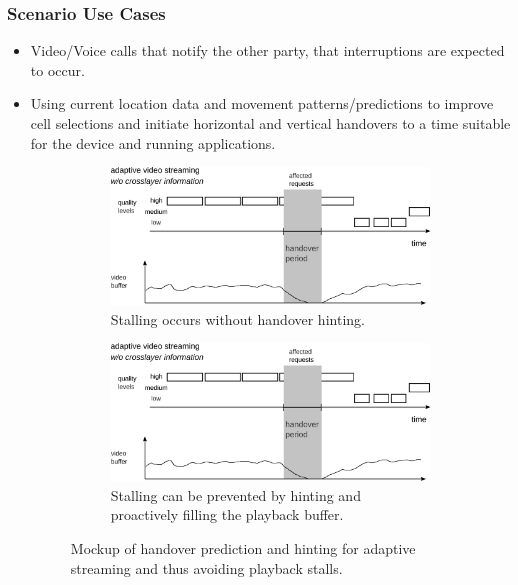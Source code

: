 		

\subsubsection{Scenario Use Cases}

\begin{itemize}
	\item Video/Voice calls that notify the other party, that interruptions are expected to occur.

	\item Using current location data and movement patterns/predictions to improve cell selections and initiate horizontal and vertical handovers to a time suitable for the device and running applications.

	\begin{figure}[htb]
	        \centering
	        \begin{subfigure}[b]{0.90\textwidth}
	            \centering
				\includegraphics[width=\textwidth]{images/adaptive-streaming-no-cl.pdf}
				\caption{Stalling occurs without handover hinting.}
				\label{c5:fig:streaming-hinting-no-cl}
	        \end{subfigure}%

	        \begin{subfigure}[b]{0.90\textwidth}
				\centering
				\includegraphics[width=\textwidth]{images/adaptive-streaming-cl.pdf}
				\caption{Stalling can be prevented by hinting and proactively filling the playback buffer.}
				\label{c5:fig:streaming-hinting-cl}
			   \end{subfigure}%
	 \caption{Mockup of handover prediction and hinting for adaptive streaming and thus avoiding playback stalls.}
	\label{c5:fig:streaming-hinting}
	\end{figure}


\end{itemize}
